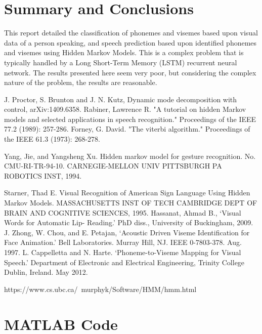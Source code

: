\documentclass[a4paper]{article}
\begin{document}
\section{Summary and Conclusions}

This report detailed the classification of phonemes and visemes based upon visual data of a person speaking, and speech prediction based upon identified phonemes and visemes using Hidden Markov Models.  This is a complex problem that is typically handled by a Long Short-Term Memory (LSTM) recurrent neural network.  The results presented here seem very poor, but considering the complex nature of the problem, the results are reasonable. 


\begin{thebibliography}{1}
	J. Proctor, S. Brunton and J. N. Kutz, Dynamic mode decomposition with control, arXiv:1409.6358.
	Rabiner, Lawrence R. "A tutorial on hidden Markov models and selected applications in speech recognition." Proceedings of the IEEE 77.2 (1989): 257-286.	
	Forney, G. David. "The viterbi algorithm." Proceedings of the IEEE 61.3 (1973): 268-278.
	
	Yang, Jie, and Yangsheng Xu. Hidden markov model for gesture recognition. No. CMU-RI-TR-94-10. CARNEGIE-MELLON UNIV PITTSBURGH PA ROBOTICS INST, 1994.

	Starner, Thad E. Visual Recognition of American Sign Language Using Hidden Markov Models. MASSACHUSETTS INST OF TECH CAMBRIDGE DEPT OF BRAIN AND COGNITIVE SCIENCES, 1995.
	Hassanat, Ahmad B., `Visual Words for Automatic Lip- Reading.' PhD diss., University of Buckingham, 2009.
	J. Zhong, W. Chou, and E. Petajan, `Acoustic Driven Viseme Identification for Face Animation.' Bell Laboratories. Murray Hill, NJ. IEEE 0-7803-378. Aug. 1997.
	L. Cappelletta and N. Harte. `Phoneme-to-Viseme Mapping for Visual Speech.' Department of Electronic and Electrical Engineering, Trinity College Dublin, Ireland. May 2012.
	
	 https://www.cs.ubc.ca/~murphyk/Software/HMM/hmm.html

\end{thebibliography}

\newpage

\appendix




\section{MATLAB Code}
\end{document}
